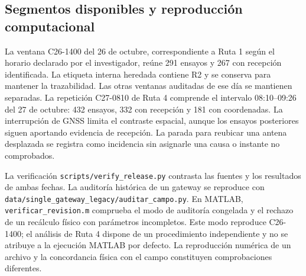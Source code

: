 \subsection{Segmentos disponibles y reproducción computacional}

La ventana C26-1400 del 26 de octubre, correspondiente a Ruta 1 según el horario declarado por el investigador, reúne 291 ensayos y 267 con recepción identificada. La etiqueta interna heredada contiene R2 y se conserva para mantener la trazabilidad. Las otras ventanas auditadas de ese día se mantienen separadas. La repetición C27-0810 de Ruta 4 comprende el intervalo 08:10--09:26 del 27 de octubre: 432 ensayos, 332 con recepción y 181 con coordenadas. La interrupción de GNSS limita el contraste espacial, aunque los ensayos posteriores siguen aportando evidencia de recepción. La parada para reubicar una antena desplazada se registra como incidencia sin asignarle una causa o instante no comprobados.

La verificación \nolinkurl{scripts/verify_release.py} contrasta las fuentes y los resultados de ambas fechas. La auditoría histórica de un gateway se reproduce con \nolinkurl{data/single_gateway_legacy/auditar_campo.py}. En MATLAB, \nolinkurl{verificar_revision.m} comprueba el modo de auditoría congelada y el rechazo de un recálculo físico con parámetros incompletos. Este modo reproduce C26-1400; el análisis de Ruta 4 dispone de un procedimiento independiente y no se atribuye a la ejecución MATLAB por defecto. La reproducción numérica de un archivo y la concordancia física con el campo constituyen comprobaciones diferentes.

